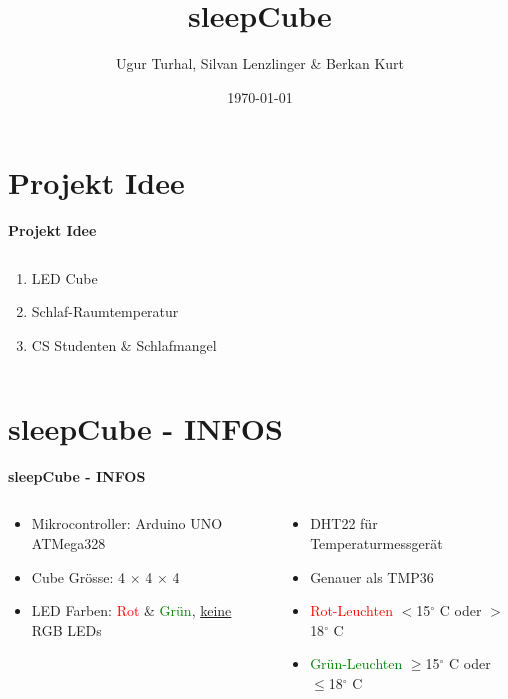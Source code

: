 \documentclass[aspectratio=169]{beamer}
\title{sleepCube}
\author{Ugur Turhal, Silvan Lenzlinger \& Berkan Kurt}
\institute{Universit\"at Basel}
\date{\today}
\begin{document}
\frame{\maketitle}


\section{Projekt Idee} 
\begin{frame}[fragile]
\textbf{Projekt Idee}
\begin{columns}
\begin{column}{0.5\textwidth}
\begin{enumerate}[-]
\item LED Cube
\item Schlaf-Raumtemperatur
\item CS Studenten \& Schlafmangel
\end{enumerate}
\end{column}

\begin{column}{0.5\textwidth}

\end{column}

\end{columns}
\end{frame}



\section{sleepCube - INFOS} 
\begin{frame}[fragile]
\textbf{sleepCube - INFOS}
\begin{columns}
\begin{column}{0.5\textwidth}
\begin{itemize}
\item Mikrocontroller: Arduino UNO ATMega328
\item Cube Grösse:  4 $\times$ 4 $\times$ 4
\item LED Farben: \textcolor{red}{Rot} \& \textcolor{green}{Grün}, \underline{keine} RGB LEDs

\end{itemize}

\end{column}

\begin{column}{0.5\textwidth}
\begin{itemize}
\item DHT22 für Temperaturmessgerät
\item Genauer als TMP36
\item \textcolor{red}{Rot-Leuchten} $<$15$^{\circ}$ C oder $>$18$^{\circ}$ C
\item \textcolor{green}{Grün-Leuchten} $\geq$15$^{\circ}$ C oder $\leq$18$^{\circ}$ C
\end{itemize}
\end{column}

\end{columns}
\end{frame}
\end{document}
